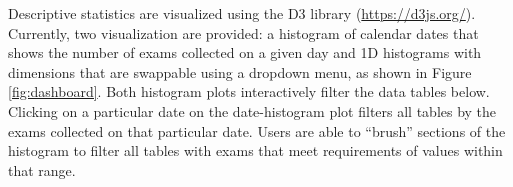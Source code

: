 Descriptive statistics are visualized using the D3 library (\href{https://d3js.org/}{https://d3js.org/}). Currently, two visualization are provided: a histogram of calendar dates that shows the number of exams collected on a given day and 1D histograms with dimensions that are swappable using a dropdown menu, as shown in Figure \ref{fig:dashboard}. Both histogram plots interactively filter the data tables below. Clicking on a particular date on the date-histogram plot filters all tables by the exams collected on that particular date. Users are able to ``brush'' sections of the histogram to filter all tables with exams that meet requirements of values within that range.  